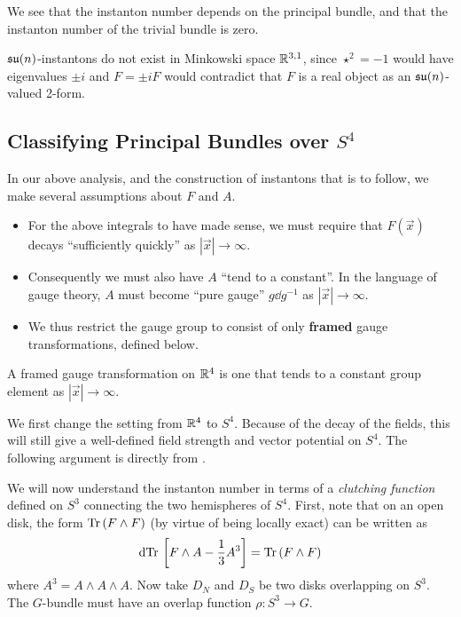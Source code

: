 	We see that the instanton number depends on the principal bundle, and that the instanton number of the trivial bundle is zero. 
	
	\begin{nb}
		$\frak{su}(n)$-instantons do not exist in Minkowski space $\mathbb{R}^{3,1}$, since $\star^2 = -1$ would have eigenvalues $\pm i$ and $F = \pm i F$ would contradict that $F$ is a real object as an $\frak{su}(n)$-valued 2-form.
	\end{nb}



	\subsection{Classifying Principal Bundles over $S^4$} %
	\label{sub:classifying_principal_bundles_over_s_4}

		In our above analysis, and the construction of instantons that is to follow, we make several assumptions about $F$ and $A$.
		\begin{itemize}
			\item For the above integrals to have made sense, we must require that $F(\vec x)$ decays ``sufficiently quickly'' as $|\vec x| \to \infty$.
			\item Consequently we must also have $A$ ``tend to a constant''. In the language of gauge theory, $A$ must become ``pure gauge'' $g \dd g^{-1}$ as $|\vec x| \to \infty$.
			\item We thus restrict the gauge group to consist of only \textbf{framed} gauge transformations, defined below.
		\end{itemize}
		\begin{defn}
			A framed gauge transformation on $\mathbb{R}^4$ is one that tends to a constant group element as $|\vec x| \to \infty$.
		\end{defn}

		We first change the setting from $\mathbb{R}^4$ to $S^4$. Because of the decay of the fields, this will still give a well-defined field strength and vector potential on $S^4$. The following argument is directly from \cite{lindenhovius2011}.
	
		We will now understand the instanton number in terms of a \emph{clutching function} defined on $S^3$ connecting the two hemispheres of $S^4$. First, note that on an open disk, the form $\mathrm{Tr}\, (F \wedge F)$ (by virtue of being locally exact) can be written as 
		\[
			\mathrm{d} \mathrm{Tr}\, \left[F \wedge A - \frac13 A^3 \right] = \mathrm{Tr}\,( F \wedge F)
		\]
		where $A^3 = A \wedge A \wedge A$.
		Now take $D_N$ and $D_S$ be two disks overlapping on $S^3$. The $G$-bundle must have an overlap function $\rho: S^3 \to G$.
	
